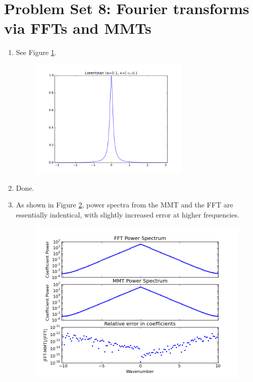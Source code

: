 \documentclass[10pt, preprint]{aastex}
\begin{document}
\section*{Problem Set 8: Fourier transforms via FFTs and MMTs}
\begin{enumerate}
\item See Figure \ref{fig1}.
\begin{figure}[!ht]
\centering
\includegraphics[width=3in]{hw8_fig1.png}
\caption{\centering \label{fig1}}
\end{figure}


\item Done.

\item As shown in Figure \ref{fig2}, power spectra from the MMT and the FFT are essentially indentical, with slightly increased error at higher frequencies. 
\begin{figure}[!ht]
\centering
\includegraphics[width=5in]{hw8_fig2.png}
\caption{\centering \label{fig2}}
\end{figure}



\end{enumerate}
\end{document}
